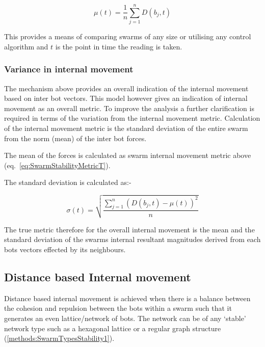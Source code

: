 \documentclass[10pt,journal,letterpaper,twoside]{IEEEtran}
\newcommand{\stability}{internal movement}
\newcommand{\Stability}{Internal movement}
\newcommand{\Eq}{eq.}
\begin{document}


\begin{equation}
\label{eq:SwarmStabilityMetricT}
\mu(t) = \frac{1}{n}{\sum_{j=1}^{n}D(b_j,t)}
\end{equation}

This provides a means of comparing swarms of any size or utilising any
control algorithm and $t$ is the point in time the reading is taken.

\subsubsection{Variance in \stability{}}\label{Section:VarienceInStability}

The mechanism above provides an overall indication of the \stability{}
based on inter bot vectors. This model however gives an indication of
\stability{} as an overall metric. To improve the analysis a further
clarification is required in terms of the variation from the
\stability{} metric. Calculation of the \stability{} metric is the
standard deviation of the entire swarm from the norm (mean) of the
inter bot forces.

The mean of the forces is calculated as swarm \stability{} metric
above (\Eq{}~\ref{eq:SwarmStabilityMetricT}).

The standard deviation is calculated as:-

\begin{equation}
\label{eq:SwarmStabilityQuotientT}
\sigma(t) = \sqrt{\frac{\sum_{j=1}^{n}(D(b_j,t)-\mu(t))^2}{n}}
\end{equation}

The true metric therefore for the overall \stability{} is the mean and
the standard deviation of the swarms internal resultant magnitudes
derived from each bots vectors effected by its neighbours.

\subsection{Distance based \Stability{}}

Distance based \stability{} is achieved when there is a balance
between the cohesion and repulsion between the bots within a swarm
such that it generates an even lattice/network of bots. The network
can be of any `stable' network type such as a hexagonal lattice or a
regular graph structure (\ref{methods:SwarmTypesStability1}).
\end{document}
